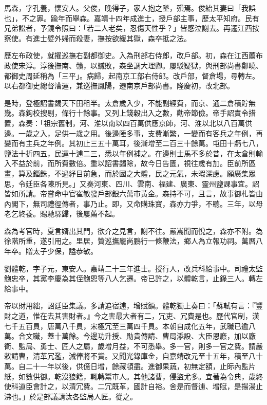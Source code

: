 \begin{pinyinscope}
馬森，字孔養，懷安人。父俊，晚得子，家人抱之墜，殞焉。俊紿其妻曰「我誤也」，不之罪。踰年而舉森。嘉靖十四年成進士，授戶部主事，歷太平知府。民有兄弟訟者，予鏡令照曰：「若二人老矣，忍傷天性乎？」皆感泣謝去。再遷江西按察使。有進士嬖外婦而殺妻，撫按欲緩其獄，森卒抵之法。

歷左布政使，就擢巡撫右副都御史。入為刑部右侍郎，改戶部。初，森在江西薦布政使宋淳。淳後撫南、贛，以贓敗，森坐調大理卿。屢駁疑獄，與刑部尚書鄭曉、都御史周延稱為「三平」。病歸，起南京工部右侍郎。改戶部，督倉場，尋轉左。以右都御史總督漕運，兼巡撫鳳陽，遷南京戶部尚書。隆慶初，改北部。

是時，登極詔書蠲天下田租半。太倉歲入少，不能副經費，而京、通二倉積貯無幾。森鉤校搜剔，條行十餘事。又列上錢穀出入之數，勸帝節儉。帝手詔責令措置，森奏：「祖宗舊制，河、淮以南以四百萬供應京師，河、淮以北以八百萬供邊。一歲之入，足供一歲之用。後邊陲多事，支費漸繁，一變而有客兵之年例，再變而有主兵之年例。其初止三五十萬耳，後漸增至二百三十餘萬。屯田十虧七八，鹽法十折四五，民運十逋二三，悉以年例補之。在邊則士馬不多於昔，在太倉則輸入不益於前，而所費數倍。重以詔書蠲除，故今日告匱，視往歲有加。臣前所區畫，算及錙銖，不過紓目前急，而於國之大體，民之元氣，未暇深慮。願廣集眾思，令廷臣各陳所見。」又奏河東、四川、雲南、福建、廣東、靈州鹽課事宜。詔皆如所請。帝嘗命中官崔敏發戶部銀六萬市黃金。森持不可，且言，故事御札皆由內閣下，無司禮徑傳者，事乃止。即，又命購珠寶，森亦力爭，不聽。三年，以母老乞終養。賜馳驛歸，後屢薦不起。

森為考官時，夏言婿出其門，欲介之見言，謝不往。嚴嵩聞而悅之，森亦不附。為徐階所重，遂引用之。里居，贊巡撫龐尚鵬行一條鞭法，鄉人為立報功祠。萬曆八年卒。贈太子少保，謚恭敏。

劉體乾，字子元，東安人。嘉靖二十三年進士。授行人，改兵科給事中。司禮太監鮑忠卒，其黨李慶為其侄鮑恩等八人乞遷。帝已許之，以體乾言，止錄三人。轉左給事中。

帝以財用絀，詔廷臣集議。多請追宿逋，增賦額。體乾獨上奏曰：「蘇軾有言：『豐財之道，惟在去其害財者。』今之害最大者有二，冗吏、冗費是也。歷代官制，漢七千五百員，唐萬八千員，宋極冗至三萬四千員。本朝自成化五年，武職已逾八萬。合文職，蓋十萬餘。今邊功升授、勛貴傳請、曹局添設、大臣恩廕，加以廠衛、監局、勇士、匠人之屬，歲增月益，不可悉舉。多一官，則多一官之費。請嚴敕請曹，清革冗濫，減俸將不貲。又聞光錄庫金，自嘉靖改元至十五年，積至八十萬。自二十一年以後，供億日增，餘藏頓盡。進御果蔬，初無定額，止眎內監片紙，如數供御。乾沒狼籍，輒轉鬻市人。其他諸曹，侵盜尤多。宜著為令典，歲終使科道臣會計之，以清冗費。二冗既革，國計自裕。舍是而督逋、增賦，是揚湯止沸也。」於是部議請汰各監局人匠。從之。


\end{pinyinscope}
